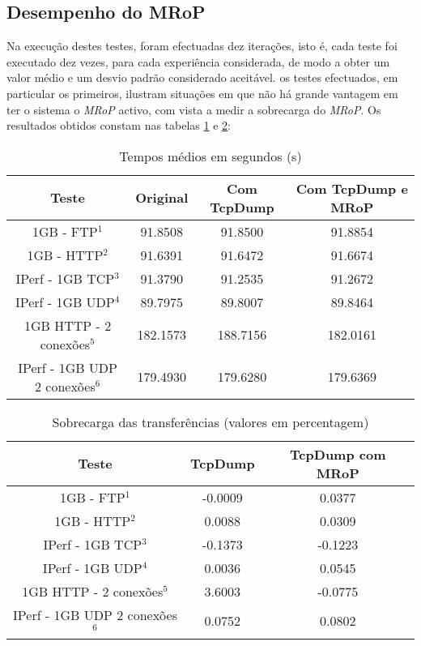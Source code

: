 \subsection{Desempenho do MRoP}


Na execução destes testes, foram efectuadas dez iterações, isto é, cada teste foi executado dez vezes, para cada experiência considerada, de modo a obter um valor médio e um desvio padrão considerado aceitável.
os testes efectuados, em particular os primeiros, ilustram situações em que não há grande vantagem em ter o sistema o \textit{MRoP} activo, com vista a medir a sobrecarga do \textit{MRoP}.
Os resultados obtidos constam nas tabelas \ref{tab:desempenho} e \ref{tab:overhead}:

\begin{table}[!htb]
\begin{center}
\caption{Tempos médios em segundos (s)}
\begin{tabular}{ | c | c | c | c |  }
\hline
Teste & \hspace {0.3cm} Original \hspace {0.3cm}& \hspace {0.2cm} Com TcpDump \hspace {0.2cm} & Com TcpDump e MRoP \\
\hline
1GB - FTP$^{1}$ & 91.8508	& 91.8500 & 91.8854 \\
1GB - HTTP$^{2}$ & 91.6391 & 91.6472 & 91.6674 \\ 
IPerf - 1GB TCP$^{3}$ & 91.3790	& 91.2535	& 91.2672 \\
IPerf - 1GB UDP$^{4}$ & 89.7975 & 89.8007 & 89.8464 \\
\hline
\hline
1GB HTTP - 2 conexões$^{5}$ & 182.1573 & 188.7156 & 182.0161 \\
IPerf - 1GB UDP 2 conexões$^{6}$ & 179.4930 & 179.6280 & 179.6369 \\
\hline
\end{tabular}
\label{tab:desempenho}
\end{center}
\end{table}

\begin{table}[!htb]
\begin{center}
\caption{Sobrecarga das transferências (valores em percentagem)}
\begin{tabular}{ | c | c | c |}
\hline
Teste & \hspace {0.3cm} TcpDump \hspace {0.3cm} & TcpDump com MRoP  \\

\hline
1GB - FTP$^{1}$ & -0.0009  & 0.0377  \\
1GB - HTTP$^{2}$ & 0.0088 &  0.0309   \\
IPerf - 1GB TCP$^{3}$ & -0.1373 &  -0.1223   \\
IPerf - 1GB UDP$^{4}$ & 0.0036 & 0.0545 \\
\hline
\hline
1GB HTTP - 2 conexões$^{5}$ & 3.6003 & -0.0775   \\
IPerf - 1GB UDP 2 conexões$^{6}$ & 0.0752 & 0.0802   \\
\hline
\end{tabular}
\label{tab:overhead}
\end{center}
\end{table}

